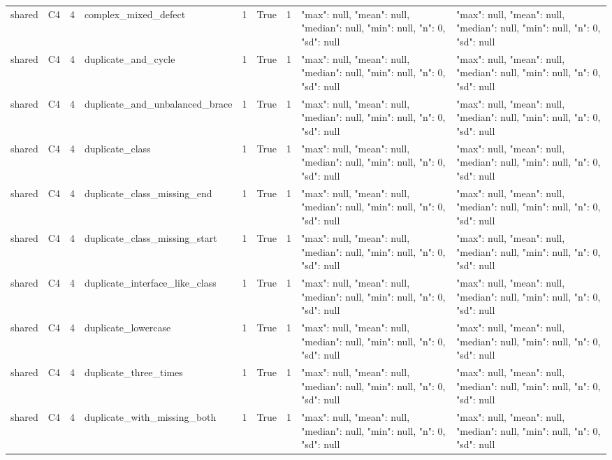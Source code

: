 \begin{tabular}{lllllllll}
shared & C4 & 4 & complex\_mixed\_defect & 1 & True & 1 & {"max": null, "mean": null, "median": null, "min": null, "n": 0, "sd": null} & {"max": null, "mean": null, "median": null, "min": null, "n": 0, "sd": null} \\
shared & C4 & 4 & duplicate\_and\_cycle & 1 & True & 1 & {"max": null, "mean": null, "median": null, "min": null, "n": 0, "sd": null} & {"max": null, "mean": null, "median": null, "min": null, "n": 0, "sd": null} \\
shared & C4 & 4 & duplicate\_and\_unbalanced\_brace & 1 & True & 1 & {"max": null, "mean": null, "median": null, "min": null, "n": 0, "sd": null} & {"max": null, "mean": null, "median": null, "min": null, "n": 0, "sd": null} \\
shared & C4 & 4 & duplicate\_class & 1 & True & 1 & {"max": null, "mean": null, "median": null, "min": null, "n": 0, "sd": null} & {"max": null, "mean": null, "median": null, "min": null, "n": 0, "sd": null} \\
shared & C4 & 4 & duplicate\_class\_missing\_end & 1 & True & 1 & {"max": null, "mean": null, "median": null, "min": null, "n": 0, "sd": null} & {"max": null, "mean": null, "median": null, "min": null, "n": 0, "sd": null} \\
shared & C4 & 4 & duplicate\_class\_missing\_start & 1 & True & 1 & {"max": null, "mean": null, "median": null, "min": null, "n": 0, "sd": null} & {"max": null, "mean": null, "median": null, "min": null, "n": 0, "sd": null} \\
shared & C4 & 4 & duplicate\_interface\_like\_class & 1 & True & 1 & {"max": null, "mean": null, "median": null, "min": null, "n": 0, "sd": null} & {"max": null, "mean": null, "median": null, "min": null, "n": 0, "sd": null} \\
shared & C4 & 4 & duplicate\_lowercase & 1 & True & 1 & {"max": null, "mean": null, "median": null, "min": null, "n": 0, "sd": null} & {"max": null, "mean": null, "median": null, "min": null, "n": 0, "sd": null} \\
shared & C4 & 4 & duplicate\_three\_times & 1 & True & 1 & {"max": null, "mean": null, "median": null, "min": null, "n": 0, "sd": null} & {"max": null, "mean": null, "median": null, "min": null, "n": 0, "sd": null} \\
shared & C4 & 4 & duplicate\_with\_missing\_both & 1 & True & 1 & {"max": null, "mean": null, "median": null, "min": null, "n": 0, "sd": null} & {"max": null, "mean": null, "median": null, "min": null, "n": 0, "sd": null} \\

\end{tabular}
